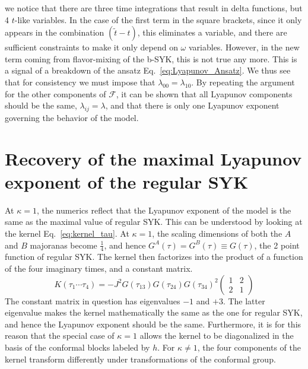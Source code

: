 we notice that there are three time integrations that result in delta functions,
but 4 $t$-like variables. In the case of the first term in the square brackets,
since it only appears in the combination $(\tilde{t} - t)$, this eliminates a variable,
and there are sufficient constraints to make it only depend on $\omega$ variables. However,
in the new term coming from flavor-mixing of the b-SYK, this is not true any more.
This is a signal of a breakdown of the ansatz Eq.~\eqref{eq:Lyapunov_Ansatz}.
We thus see that for consistency we must impose that $\lambda_{00} = \lambda_{10}$.
By repeating the argument for the other components of $\mathcal{F}$,
it can be shown that all Lyapunov components should be the same, $\lambda_{ij} = \lambda$,
and that there is only one Lyapunov exponent governing the behavior of the model.

\section{Recovery of the maximal Lyapunov exponent of the regular SYK}
At $\kappa=1$, the numerics reflect that the Lyapunov exponent of the model is the same as the maximal value of regular SYK. This can be understood by looking at the kernel Eq.~\eqref{eq:kernel_tau}. At $\kappa=1$, the scaling dimensions of both the $A$ and $B$ majoranas become $\frac{1}{4}$, and hence $G^A(\tau) = G^B(\tau) \equiv G(\tau)$, the 2 point function of regular SYK. The kernel then factorizes into the product of a function of the four imaginary times, and a constant matrix. 
\begin{equation}
	K(\tau_1\cdots\tau_4) = -J^2 G(\tau_{13})G(\tau_{24})G(\tau_{34})^2 \begin{pmatrix}
		1 & 2 \\
		2 & 1
	\end{pmatrix}
\end{equation}
The constant matrix in question has eigenvalues $-1$ and $+3$. The latter eigenvalue makes the kernel mathematically the same as the one for regular SYK, and hence the Lyapunov exponent should be the same.  Furthermore, it is for this reason that the special case of $\kappa=1$ allows the kernel to be diagonalized in the basis of the conformal blocks labeled by $h$. For $\kappa \neq 1$, the four components of the kernel transform differently under transformations of the conformal group. 



